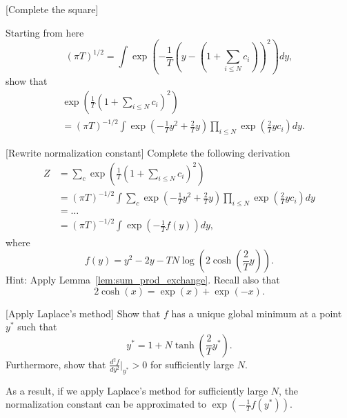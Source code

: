 \begin{exercise}{[Complete the square]}

Starting from here
%
\begin{equation}
\left(\pi T\right)^{1/2} = \int \exp\left(-\frac{1}{T}\left(y - \left(1 + \sum_{i \leq N}c_i\right)\right)^2\right)dy,
\end{equation}
%
show that
%
\begin{align*}
&\exp\left(\frac{1}{T}\left(1 + \sum_{i \leq N}c_i\right)^2\right)\\ 
&= \left(\pi T\right)^{-1/2}\int\exp\left(-\frac{1}{T}y^2 + \frac{2}{T}y\right) \prod_{i \leq N}\exp\left(\frac{2}{T}y c_i\right) dy.
\end{align*}
%
\end{exercise}

\begin{exercise}{[Rewrite normalization constant]}
Complete the following derivation
%
\begin{align}
Z &= \sum_{c} \exp\left(\frac{1}{T}\left(1 + \sum_{i \leq N}c_i\right)^2\right)\\ 
&= \left(\pi T\right)^{-1/2}\int\sum_{c}\exp\left(-\frac{1}{T}y^2 + \frac{2}{T}y\right) \prod_{i \leq N}\exp\left(\frac{2}{T}y c_i\right) dy\\
&= \ldots \\
&= \left(\pi T\right)^{-1/2}\int \exp\left(-\frac{1}{T}f(y)\right) dy,\label{eq:norm_cost_ugly_integral}
\end{align}
%
where
%
\begin{equation}
f(y) = y^2 - 2 y - T N \log \left(2 \cosh\left(\frac{2}{T}y\right)\right).
\end{equation}
%
Hint: Apply Lemma~\ref{lem:sum_prod_exchange}. Recall also that
%
\begin{equation}
2 \cosh(x) = \exp(x) + \exp(-x).
\end{equation}
%
\end{exercise}

\begin{exercise}{[Apply Laplace's method]}
Show that $f$ has a unique global minimum at a point $y^*$ such that
%
\begin{equation}
y^* = 1 + N \tanh\left(\frac{2}{T}y^*\right).
\end{equation}
% 
Furthermore, show that $\frac{d^2f}{dy^2}\bigr|_{y^*} > 0$ for sufficiently large $N$.
\end{exercise}

As a result, if we apply Laplace's method for sufficiently large $N$, the normalization constant can be approximated to $\exp\left(-\frac{1}{T}f(y^*)\right)$.
%
%

